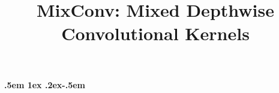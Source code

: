 \documentclass{sty/bmvc2k}
\title{\Large MixConv: Mixed Depthwise Convolutional Kernels}
\begin{document}
\maketitle	
\def\TODO{\textcolor{red}{\emph{TODO: }}}
\newcommand{\TT}[1]{\texttt{#1}}
\newcommand{\BF}[1]{\textbf{#1}}
\newcommand{\IT}[1]{\textit{#1}}

\newcommand\blfootnote[1]{\begingroup
	\renewcommand\thefootnote{}\footnote{#1}\addtocounter{footnote}{-1}\endgroup
}


\newcommand{\km}[1]{{\color{red}[km: #1]}}                                          
\newcommand{\rbg}[1]{{\color{blue}[rbg: #1]}}                                       
\newcommand{\ppd}[1]{{\color{green}[ppd: #1]}}                                      
\newcommand{\bd}[1]{\textbf{#1}}                                                    
\newcommand{\app}{\raise.17ex\hbox{}}                             
\newcommand{\symb}[1]{{\small\texttt{#1}}\xspace}                                   
\newcommand{\mrtwo}[1]{\multirow{2}{*}{#1}}                                         
\def\x{\times}                                                                      
\def\pt{p_\textrm{t}}                                                               
\def\at{\alpha_\textrm{t}}                                                          
\def\xt{x_\textrm{t}}                                                               
\def\CE{\textrm{CE}}                                                                
\def\FL{\textrm{FL}}                                                                
\def\FQ{\textrm{FL}^*}                                                              
\newcommand{\eqnnm}[2]{\ignorespaces}

\newlength\savewidth\newcommand\shline{\noalign{\global\savewidth\arrayrulewidth 
		\global\arrayrulewidth 1pt}\hline\noalign{\global\arrayrulewidth\savewidth}}   
\newcommand{\tablestyle}[2]{\setlength{\tabcolsep}{#1}\renewcommand{\arraystretch}{#2}\centering\footnotesize}
\makeatletter\renewcommand\paragraph{              
	{.5em \@plus1ex \@minus.2ex}{-.5em}{\normalfont\normalsize\bfseries}}\makeatother
\renewcommand{\dbltopfraction}{1}                                                   
\renewcommand{\bottomfraction}{0}                                                   
\renewcommand{\textfraction}{0}                                                     
\renewcommand{\dblfloatpagefraction}{0.95}                                          
\setcounter{dbltopnumber}{5}
\end{document}
